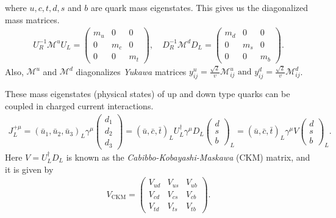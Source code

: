 where $u,c,t,d,s$ and $b$ are quark mass eigenstates. This gives us the diagonalized mass matrices. 
\begin{eqnarray}
U_{R}^{-1} \mathcal{M}^{u} U_{L}=\left(\begin{array}{ccc}{m_{u}} & {0} & {0} \\ {0} & {m_{c}} & {0} \\ {0} & {0} & {m_{t}}\end{array}\right), \quad D_{R}^{-1} \mathcal{M}^{d} D_{L}=\left(\begin{array}{ccc}{m_{d}} & {0} & {0} \\ {0} & {m_{s}} & {0} \\ {0} & {0} & {m_{b}}\end{array}\right).
\end{eqnarray}
Also, $\mathcal{M}^u$ and $\mathcal{M}^d$ diagonalizes \textit{Yukawa} matrices $y_{i j}^{u}=\frac{\sqrt{2}}{v} \mathcal{M}_{i j}^{u} \text { and } y_{i j}^{d}=\frac{\sqrt{2}}{v} \mathcal{M}_{i j}^{d}$.\par
These mass eigenstates (physical states) of up and down type quarks can be coupled in charged current interactions.
\begin{eqnarray}
J_{L}^{+\mu}=\left(\bar{u}_{1}, \bar{u}_{2}, \bar{u}_{3}\right)_{L} \gamma^{\mu}\left(\begin{array}{c}{d_{1}} \\ {d_{2}} \\ {d_{3}}\end{array}\right)=(\bar{u}, \bar{c}, \bar{t})_{L} U_{L}^{\dagger} \gamma^{\mu} D_{L}\left(\begin{array}{c}{d} \\ {s} \\ {b}\end{array}\right)_{L}=(\bar{u}, \bar{c}, \bar{t})_{L} \gamma^{\mu} V\left(\begin{array}{c}{d} \\ {s} \\ {b}\end{array}\right)_{L}.
\end{eqnarray} 
Here $V=U_{L}^{\dagger}D_{L}$ is known as the \textit{Cabibbo-Kobayashi-Maskawa} (CKM) matrix, and  it is given by 
\begin{eqnarray}
V_{\text{CKM}}=\left(\begin{array}{ccc}{V_{u d}} & {V_{u s}} & {V_{u b}} \\ {V_{c d}} & {V_{c s}} & {V_{c b}} \\ {V_{t d}} & {V_{t s}} & {V_{t b}}\end{array}\right).
\end{eqnarray}
